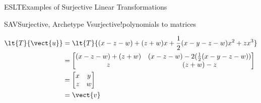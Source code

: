 \begin{subsect}{ESLT}{Examples of Surjective Linear Transformations}
\begin{example}{SAV}{Surjective, Archetype V}{surjective!polynomials to matrices}
\begin{para}
%
\begin{align*}
\lt{T}{\vect{u}}&=\lt{T}{(x-z-w)+(z+w)x+\frac{1}{2}(x-y-z-w)x^2+zx^3}\\
%
&=
\begin{bmatrix}
(x-z-w)+(z+w) & (x-z-w) - 2(\frac{1}{2}(x-y-z-w))\\
z & (z+w)-z
\end{bmatrix}\\
%
&=
\begin{bmatrix}
x & y\\
z & w
\end{bmatrix}\\
&=\vect{v}
%
\end{align*}
\end{para}
%
\end{example}
%
\end{subsect}
%
